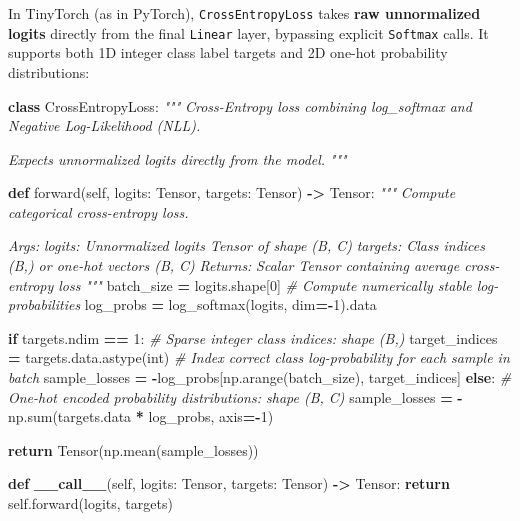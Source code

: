 \documentclass[
  letterpaper,
]{scrbook}
\newenvironment{Shaded}{\begin{snugshade}}{\end{snugshade}}
\newcommand{\BuiltInTok}[1]{#1}
\newcommand{\CommentTok}[1]{\textcolor[rgb]{0.56,0.35,0.01}{\textit{#1}}}
\newcommand{\ControlFlowTok}[1]{\textcolor[rgb]{0.13,0.29,0.53}{\textbf{#1}}}
\newcommand{\DecValTok}[1]{\textcolor[rgb]{0.00,0.00,0.81}{#1}}
\newcommand{\FunctionTok}[1]{\textcolor[rgb]{0.13,0.29,0.53}{\textbf{#1}}}
\newcommand{\KeywordTok}[1]{\textcolor[rgb]{0.13,0.29,0.53}{\textbf{#1}}}
\newcommand{\NormalTok}[1]{#1}
\newcommand{\OperatorTok}[1]{\textcolor[rgb]{0.81,0.36,0.00}{\textbf{#1}}}
\newcommand{\VariableTok}[1]{\textcolor[rgb]{0.00,0.00,0.00}{#1}}
\begin{document}
In TinyTorch (as in PyTorch), \texttt{CrossEntropyLoss} takes
\textbf{raw unnormalized logits} directly from the final \texttt{Linear}
layer, bypassing explicit \texttt{Softmax} calls. It supports both 1D
integer class label targets and 2D one-hot probability distributions:

\begin{Shaded}
\begin{Highlighting}[]
\KeywordTok{class}\NormalTok{ CrossEntropyLoss:}
    \CommentTok{"""}
\CommentTok{    Cross{-}Entropy loss combining log\_softmax and Negative Log{-}Likelihood (NLL).}

\CommentTok{    Expects unnormalized logits directly from the model.}
\CommentTok{    """}

    \KeywordTok{def}\NormalTok{ forward(}\VariableTok{self}\NormalTok{, logits: Tensor, targets: Tensor) }\OperatorTok{{-}\textgreater{}}\NormalTok{ Tensor:}
        \CommentTok{"""}
\CommentTok{        Compute categorical cross{-}entropy loss.}

\CommentTok{        Args:}
\CommentTok{            logits: Unnormalized logits Tensor of shape (B, C)}
\CommentTok{            targets: Class indices (B,) or one{-}hot vectors (B, C)}
\CommentTok{        Returns:}
\CommentTok{            Scalar Tensor containing average cross{-}entropy loss}
\CommentTok{        """}
\NormalTok{        batch\_size }\OperatorTok{=}\NormalTok{ logits.shape[}\DecValTok{0}\NormalTok{]}
        \CommentTok{\# Compute numerically stable log{-}probabilities}
\NormalTok{        log\_probs }\OperatorTok{=}\NormalTok{ log\_softmax(logits, dim}\OperatorTok{={-}}\DecValTok{1}\NormalTok{).data}

        \ControlFlowTok{if}\NormalTok{ targets.ndim }\OperatorTok{==} \DecValTok{1}\NormalTok{:}
            \CommentTok{\# Sparse integer class indices: shape (B,)}
\NormalTok{            target\_indices }\OperatorTok{=}\NormalTok{ targets.data.astype(}\BuiltInTok{int}\NormalTok{)}
            \CommentTok{\# Index correct class log{-}probability for each sample in batch}
\NormalTok{            sample\_losses }\OperatorTok{=} \OperatorTok{{-}}\NormalTok{log\_probs[np.arange(batch\_size), target\_indices]}
        \ControlFlowTok{else}\NormalTok{:}
            \CommentTok{\# One{-}hot encoded probability distributions: shape (B, C)}
\NormalTok{            sample\_losses }\OperatorTok{=} \OperatorTok{{-}}\NormalTok{np.}\BuiltInTok{sum}\NormalTok{(targets.data }\OperatorTok{*}\NormalTok{ log\_probs, axis}\OperatorTok{={-}}\DecValTok{1}\NormalTok{)}

        \ControlFlowTok{return}\NormalTok{ Tensor(np.mean(sample\_losses))}

    \KeywordTok{def} \FunctionTok{\_\_call\_\_}\NormalTok{(}\VariableTok{self}\NormalTok{, logits: Tensor, targets: Tensor) }\OperatorTok{{-}\textgreater{}}\NormalTok{ Tensor:}
        \ControlFlowTok{return} \VariableTok{self}\NormalTok{.forward(logits, targets)}
\end{Highlighting}
\end{Shaded}
\end{document}
